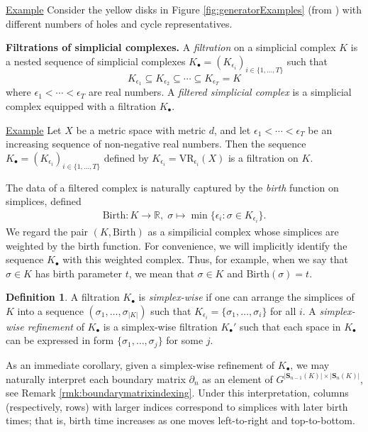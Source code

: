 \documentclass[11pt,onecolumn]{article}
\newcommand{\R}{\mathbb{R}}
\newcommand{\Simplices}[0]{\mathbf{S}}
\newcommand{\fig}{Figure }
\newcommand{\birth}{\mathrm{Birth}}
\newcommand{\simplex}{\sigma}
\theoremstyle{plain}
\theoremstyle{definition}
\newtheorem{definition}[theorem]{Definition}
\begin{document}
\noindent \underline{Example} Consider the yellow disks in \fig \ref{fig:generatorExamples} (from  \cite{Carlsson2009TopologyAD}) with different numbers of holes and cycle representatives. 


 

\noindent \textbf{Filtrations of simplicial complexes.} A \emph{filtration} on a simplicial complex $K$ is a nested sequence of  simplicial complexes $K_\bullet = (K_{\epsilon_i})_{i \in\{ 1, \ldots, T\}}$ such that
    $$
    K_{\epsilon_1} \subseteq K_{\epsilon_2} \subseteq \cdots \subseteq K_{\epsilon_T} = K
    $$
where $\epsilon_1 < \cdots < \epsilon_T$ are real numbers. A \emph{filtered simplicial complex} is a simplicial complex equipped with a filtration $K_\bullet$.

\noindent \underline{Example}
 Let  $X$ be a metric space with metric $d$, and let  $\epsilon_1 < \cdots < \epsilon_T$ be an increasing sequence of non-negative real numbers.  Then the sequence $K_\bullet = (K_{\epsilon_i})_{i \in\{ 1, \ldots, T\}}$ defined by $K_{\epsilon_i} = \text{VR}_{\epsilon_i}(X)$ is a filtration on $K$.

The data of a filtered complex is naturally captured by the \emph{birth} function on simplices, defined
    \begin{align*}
        \birth: K \to \R, \; \simplex \mapsto \min\{ \epsilon_i : \simplex \in K_{\epsilon_i} \}.
    \end{align*}
We regard the pair $(K, \birth)$ as a simpilicial complex whose simplices are weighted by the birth function.   For convenience, we will implicitly identify the sequence $K_\bullet$ with this weighted complex.   Thus, for example, when we say that $\simplex \in K$ has birth parameter $t$, we mean that  $\sigma\in K$ and  $\birth(\sigma) = t$.


\begin{definition}
A filtration $K_\bullet$ is \emph{simplex-wise} if one can arrange the simplices of $K$ into a sequence $(\simplex_1, \ldots, \simplex_{|K|})$ such that $K_{\epsilon_i} = \{\simplex_1, \ldots, \simplex_i\}$ for all $i$.  
A \emph{simplex-wise refinement}  of $K_\bullet$ is a simplex-wise filtration $K_\bullet'$ such that each space in $K_\bullet$ can be expressed in form $\{\simplex_1, \ldots, \simplex_j\}$ for some $j$.
\end{definition}
 

As an immediate corollary, given a simplex-wise refinement of $K_\bullet$, we may naturally interpret each boundary matrix $\partial_n$ as an element of $G^{|\Simplices_{n-1}(K)| \times |\Simplices_{n}(K)|}$, see Remark \ref{rmk:boundarymatrixindexing}.  Under this interpretation, columns (respectively, rows) with larger indices correspond to simplices with later birth times; that is, birth time increases as one moves left-to-right and top-to-bottom.  
\end{document}
